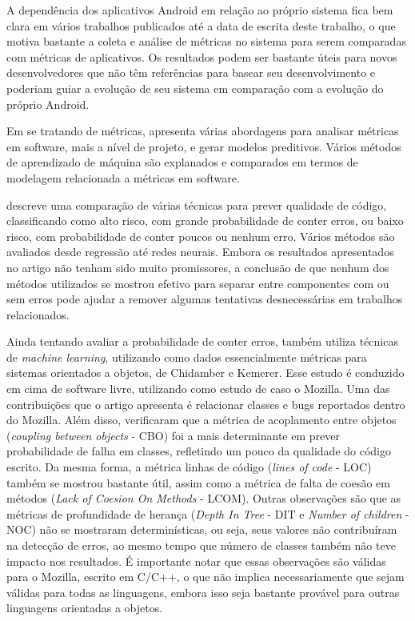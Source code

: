 A dependência dos aplicativos Android em relação ao próprio sistema fica bem clara em vários trabalhos publicados até a data de escrita deste trabalho, o que motiva bastante a coleta e análise de métricas no sistema para serem comparadas com métricas de aplicativos. Os resultados podem ser bastante úteis para novos desenvolvedores que não têm referências para basear seu desenvolvimento e poderiam guiar a evolução de seu sistema em comparação com a evolução do próprio Android.

Em se tratando de métricas,  apresenta várias abordagens para analisar métricas em software, mais a nível de projeto, e gerar modelos preditivos. Vários métodos de aprendizado de máquina são explanados e comparados em termos de modelagem relacionada a métricas em software. 

 descreve uma comparação de várias técnicas para prever qualidade de código, classificando como alto risco, com grande probabilidade de conter erros, ou baixo risco, com probabilidade de conter poucos ou nenhum erro. Vários métodos são avaliados desde regressão até redes neurais. Embora os resultados apresentados no artigo não tenham sido muito promissores, a conclusão de que nenhum dos métodos utilizados se mostrou efetivo para separar entre componentes com ou sem erros pode ajudar a remover algumas tentativas desnecessárias em trabalhos relacionados.

Ainda tentando avaliar a probabilidade de conter erros,  também utiliza técnicas de \textit{machine learning}, utilizando como dados essencialmente métricas para sistemas orientados a objetos, de Chidamber e Kemerer. Esse estudo é conduzido em cima de software livre, utilizando como estudo de caso o Mozilla. Uma das contribuições que o artigo apresenta é relacionar classes e bugs reportados dentro do Mozilla. Além disso, verificaram que a métrica de acoplamento entre objetos (\textit{coupling between objects} - CBO) foi a mais determinante em prever probabilidade de falha em classes, refletindo um pouco da qualidade do código escrito. Da mesma forma, a métrica linhas de código (\textit{lines of code} - LOC) também se mostrou bastante útil, assim como a métrica de falta de coesão em métodos (\textit{Lack of Coesion On Methods} - LCOM). Outras observações são que as métricas de profundidade de herança (\textit{Depth In Tree} - DIT e \textit{Number of children} - NOC) não se mostraram determinísticas, ou seja, seus valores não contribuíram na detecção de erros, ao mesmo tempo que  número de classes também não teve impacto nos resultados. É importante notar que essas observações são válidas para o Mozilla, escrito em C/C++, o que não implica necessariamente que sejam válidas para todas as linguagens, embora isso seja bastante provável para outras linguagens orientadas a objetos.

